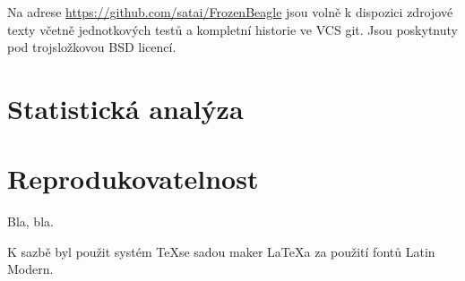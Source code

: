 Na adrese \url {https://github.com/satai/FrozenBeagle} jsou volně k dispozici zdrojové texty včetně jednotkových testů a kompletní historie ve VCS git. Jsou poskytnuty pod trojsložkovou BSD licencí.

\section{Statistická analýza}

\section{Reprodukovatelnost}

Bla, bla.

K sazbě byl použit systém \TeX se sadou maker \LaTeX a za použití fontů Latin Modern.
